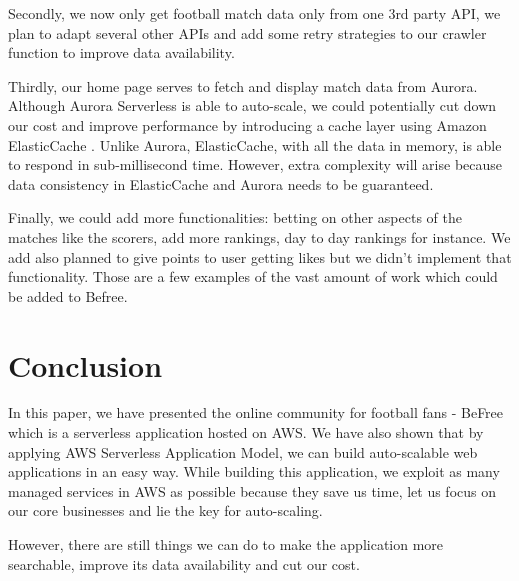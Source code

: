 \documentclass[conference]{IEEEtran}
\begin{document}
Secondly, we now only get football match data only from one 3rd party API, we plan to adapt several other APIs and add some retry strategies to our crawler function to improve data availability.

Thirdly, our home page serves to fetch and display match data from Aurora. Although Aurora Serverless is able to auto-scale, we could potentially cut down our cost and improve performance by introducing a cache layer using Amazon ElasticCache \cite{elasticcache}. Unlike Aurora, ElasticCache, with all the data in memory, is able to respond in sub-millisecond time. However, extra complexity will arise because data consistency in ElasticCache and Aurora needs to be guaranteed.

Finally, we could add more functionalities: betting on other aspects of the matches like the scorers, add more rankings, day to day rankings for instance. We add also planned to give points to user getting likes but we didn't implement that functionality. Those are a few examples of the vast amount of work which could be added to Befree.

\section{Conclusion}
In this paper, we have presented the online community for football fans - BeFree which is a serverless application hosted on AWS. We have also shown that by applying AWS Serverless Application Model, we can build auto-scalable web applications in an easy way. While building this application, we exploit as many managed services in AWS as possible because they save us time, let us focus on our core businesses and lie the key for auto-scaling.

However, there are still things we can do to make the application more searchable, improve its data availability and cut our cost.
\end{document}

